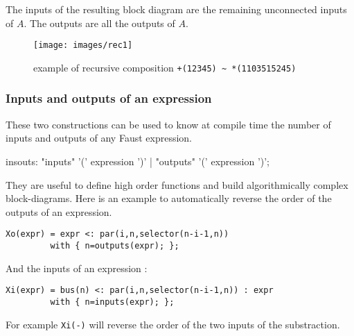 The inputs of the resulting block diagram are the remaining unconnected inputs of $A$. The outputs are all the outputs of $A$.
 
\begin{figure}[h]
\centering 
\texttt{[image: images/rec1]} 
\caption{example of recursive composition \lstinline'+(12345) ~ *(1103515245)'}  
\label{figure:rec1}
\end{figure}

\subsubsection{Inputs and outputs of an expression}
These two constructions can be used to know at compile time the number of inputs and outputs of any Faust expression. 

\begin{rail}
insouts: "inputs" '(' expression ')'
       | "outputs" '(' expression ')';
\end{rail}

They are useful to define high order functions and build algorithmically complex block-diagrams. Here is an example to automatically reverse the order of the outputs of an expression.

\begin{lstlisting}
Xo(expr) = expr <: par(i,n,selector(n-i-1,n)) 
		 with { n=outputs(expr); };
\end{lstlisting}

And the inputs of an expression :

\begin{lstlisting}
Xi(expr) = bus(n) <: par(i,n,selector(n-i-1,n)) : expr 
		 with { n=inputs(expr); };
\end{lstlisting}

For example \lstinline'Xi(-)' will reverse the order of the two inputs of the substraction.





